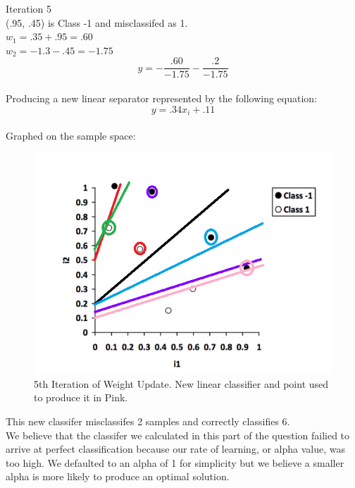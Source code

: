 \documentclass[12pt]{article}
\begin{document}
Iteration 5 \\
(.95, .45) is Class -1 and misclassifed as 1.\\
$w_1 = .35+.95 = .60$\\
$w_2= -1.3-.45= -1.75$\\
\begin{equation}
y = -\frac{.60}{-1.75} - \frac{.2}{-1.75}
\end{equation}\\
Producing a new linear separator represented by the following equation:\\
\begin{equation}
y = .34x_i + .11
\end{equation}\\
Graphed on the sample space: \\
\begin{figure}[H]
    \centering
    \includegraphics[width=1\textwidth]{question_4_plot_a_it5}
    \caption{5th Iteration of Weight Update. New linear classifier and point used to produce it in Pink.}
    \label{fig:question_4_plot_a_it5}
\end{figure}
This new classifer misclassifes 2 samples and correctly classifies 6.\\

We believe that the classifer we calculated in this part of the question failied to arrive at perfect classification because our rate of learning, or alpha value, was too high. We defaulted to an alpha of 1 for simplicity but we believe a smaller alpha is more likely to produce an optimal solution.
\end{document}
